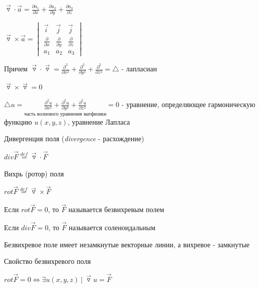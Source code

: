 \documentclass[12pt]{article}
\begin{document}
    $\overrightarrow{\triangledown} \cdot \overrightarrow{a} = \frac{\partial a_1}{\partial x} + \frac{\partial a_2}{\partial y} + \frac{\partial a_3}{\partial z}$

    $\overrightarrow{\triangledown} \times \overrightarrow{a} =
    \begin{vmatrix}
        \overrightarrow{i}          & \overrightarrow{j}          & \overrightarrow{j}          \\
        \frac{\partial}{\partial x} & \frac{\partial}{\partial y} & \frac{\partial}{\partial z} \\
        a_1                         & a_2                         & a_3
    \end{vmatrix}$

    Причем $\overrightarrow{\triangledown} \cdot \overrightarrow{\triangledown} = \frac{\partial^2}{\partial x^2} + \frac{\partial^2}{\partial y^2} + \frac{\partial^2}{\partial z^2} = \triangle$ - лапласиан

    $\overrightarrow{\triangledown} \times \overrightarrow{\triangledown} = 0$

    \Nota $\triangle u = \underset{\text{часть волнового уравнения матфизики}}{\frac{\partial^2 u}{\partial x^2} + \frac{\partial^2 u}{\partial y^2} + \frac{\partial^2 u}{\partial z^2}} = 0$ - уравнение, определяющее гармоническую функцию $u(x, y, z)$, уравнение Лапласа

     \hypertarget{divergencyya}{Дивергенция} поля (\textit{divergence} - расхождение)

    $div \overrightarrow{F} \stackrel{def}{=} \overrightarrow{\triangledown} \cdot \overrightarrow{F}$

     \hypertarget{rotor}{Вихрь (ротор)} поля

    $rot \overrightarrow{F} \stackrel{def}{=} \overrightarrow{\triangledown} \times \overrightarrow{F}$

     Если $rot \overrightarrow{F} = 0$, то $\overrightarrow{F}$ называется \hypertarget{bezvihrevoepole}{безвихревым} полем

     Если $div \overrightarrow{F} = 0$, то $\overrightarrow{F}$ называется \hypertarget{solenoidalnoepole}{соленоидальным}

    \Nota Безвихревое поле имеет незамкнутые векторные линии, а вихревое - замкнутые

     Свойство безвихревого поля

    $rot \overrightarrow{F} = 0 \Longleftrightarrow \exists u(x, y, z) \ | \ \overrightarrow{\triangledown}u = \overrightarrow{F}$
\end{document}
